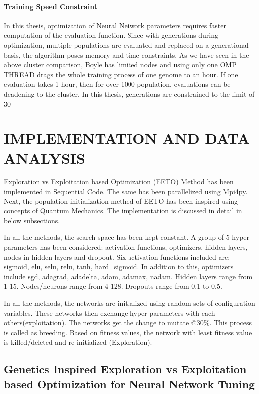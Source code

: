 \subsubsection{Training Speed Constraint}
In this thesis, optimization of Neural Network parameters requires faster computation of the evaluation function. Since with generations during optimization, multiple populations are evaluated and replaced on a generational basis, the algorithm poses memory and time constraints. As we have seen in the above cluster comparison, Boyle has limited nodes and using only one OMP THREAD drags the whole training process of one genome to an hour.
If one evaluation takes 1 hour, then for over 1000 population, evaluations can be deadening to the cluster. In this thesis, generations are constrained to the limit of 30




\chapter{IMPLEMENTATION AND DATA ANALYSIS}

Exploration vs Exploitation based Optimization (EETO) Method has been implemented in Sequential Code. The same has been parallelized using Mpi4py. Next, the population initialization method of EETO has been inspired using concepts of Quantum Mechanics. The implementation is discussed in detail in below subsections.

In all the methods, the search space has been kept constant. A group of 5 hyper-parameters has been considered:
activation functions, optimizers, hidden layers, nodes in hidden layers
and dropout. Six activation functions included are: sigmoid, elu, selu, relu, tanh, hard\_sigmoid. In addition to this, optimizers include sgd, adagrad, adadelta, adam, adamax, nadam. Hidden layers range from 1-15. Nodes/neurons range from 4-128. Dropouts range from 0.1 to 0.5.

In all the methods, the networks are initialized using random sets
of configuration variables. These networks then exchange
hyper-parameters with each others(exploitation). The networks get
the change to mutate @30\%. This process is called as breeding. Based on fitness values, the network with least fitness value is killed/deleted and re-initialized (Exploration). 


\section{Genetics Inspired Exploration vs Exploitation based Optimization for Neural Network Tuning}

